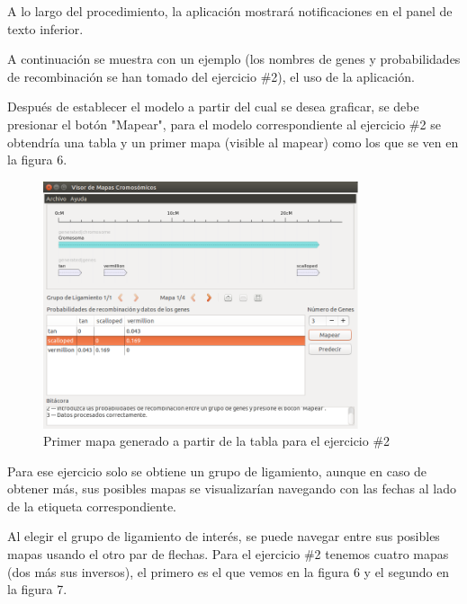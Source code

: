 \documentclass{article}
\begin{document}
	\pagebreak
	A lo largo del procedimiento, la aplicación mostrará notificaciones en el panel de texto inferior.
	
	A continuación se muestra con un ejemplo (los nombres de genes y probabilidades de recombinación se han tomado del ejercicio \#2), el uso de la aplicación.
	
	Después de establecer el modelo a partir del cual se desea graficar, se debe presionar el botón "Mapear", para el modelo correspondiente al ejercicio \#2 se obtendría una tabla y un primer mapa (visible al mapear) como los que se ven en la figura 6.
	
	\begin{figure}[h!]
		\centering
			\includegraphics[width=350px, keepaspectratio=false]{report3}
				\caption{Primer mapa generado a partir de la tabla para el ejercicio \#2}
	\end{figure}
	\pagebreak
		
	Para ese ejercicio solo se obtiene un grupo de ligamiento, aunque en caso de obtener más, sus posibles mapas se visualizarían navegando con las fechas al lado de la etiqueta correspondiente.
	
	Al elegir el grupo de ligamiento de interés, se puede navegar entre sus posibles mapas usando el otro par de flechas. Para el ejercicio \#2 tenemos cuatro mapas (dos más sus inversos), el primero es el que vemos en la figura 6 y el segundo en la figura 7.
	
\end{document}
